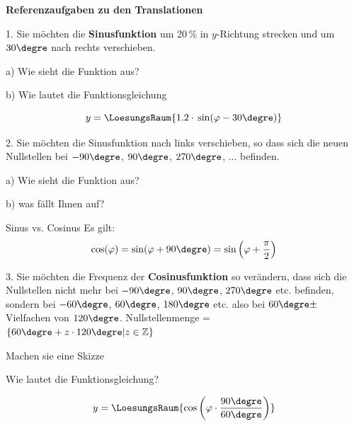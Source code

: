 


\textbf{Referenzaufgaben zu den Translationen}

1. Sie möchten die \textbf{Sinusfunktion} um 20\,\% in $y$-Richtung strecken und um
$30\degre$ nach rechts verschieben.

a) Wie sieht die Funktion aus?

\renewcommand{\bbwFunctionColour}{gray!30}\noTRAINER{\trigsysDsin{}}
\renewcommand{\bbwFunctionColour}{blue}


b) Wie lautet die Funktionsgleichung

$$y = \LoesungsRaum{1.2 \cdot{} \sin(\varphi - 30\degre)}$$
\newpage


2. Sie möchten die Sinusfunktion nach links verschieben, so dass sich die neuen Nullstellen bei
$-90\degre$, $90\degre$, $270\degre$, ... befinden.

a) Wie sieht die Funktion aus?

\noTRAINER{\renewcommand\bbwFunctionColour{gray!30}\trigsysDsin{}}
\TRAINER{\renewcommand\bbwFunctionColour{blue}\trigsysDcos{}}

b) was fällt Ihnen auf?

\begin{gesetz}{Sinus vs. Cosinus}{}
  Es gilt: $$\cos(\varphi)=\sin(\varphi+90\degre)=\sin\left(\varphi + \frac\pi2\right)$$
\end{gesetz}
\newpage

3. Sie möchten die Frequenz der \textbf{Cosinusfunktion} so verändern, dass sich die
Nullstellen nicht mehr bei $-90\degre$, $90\degre$, $270\degre$
etc. befinden, sondern bei $-60\degre$, $60\degre$, $180\degre$
etc. also bei $60\degre \pm$ Vielfachen von
$120\degre$. Nullstellenmenge = $\{60\degre+z\cdot{}120\degre|
z\in\mathbb{Z}\}$

Machen sie eine Skizze

\renewcommand\bbwFunctionColour{gray!30}


\noTRAINER{\trigsysDcos{}}

Wie lautet die Funktionsgleichung?

$$y = \LoesungsRaum{\cos\left(\varphi \cdot \frac{90\degre}{60\degre}\right)}$$
\newpage








